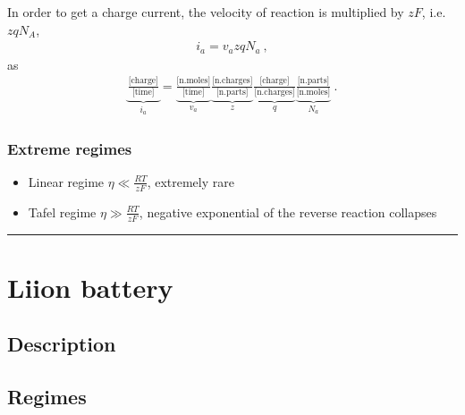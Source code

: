 \documentclass[letterpaper,10pt,english]{jupyterBook}
\begin{document}
\sphinxAtStartPar
In order to get a charge current, the velocity of reaction is multiplied by \(z F\), i.e. \(z q N_A\),
\begin{equation*}
\begin{split}i_a = v_a z q N_a \ ,\end{split}
\end{equation*}
\sphinxAtStartPar
as
\begin{equation*}
\begin{split}
\underbrace{\frac{\text{[charge]}}{\text{[time]}}}_{i_a} = 
\underbrace{\frac{\text{[n.moles]}}{\text{[time]}}}_{v_a}
\underbrace{\frac{\text{[n.charges]}}{\text{[n.parts]}}}_{z}
\underbrace{\frac{\text{[charge]}}{\text{[n.charges]}}}_{q}
\underbrace{\frac{\text{[n.parts]}}{\text{[n.moles]}}}_{N_a} \  .\end{split}
\end{equation*}\subsubsection*{Extreme regimes}
\begin{itemize}
\item {} 
\sphinxAtStartPar
Linear regime \(\eta \ll \frac{RT}{zF}\), extremely rare

\item {} 
\sphinxAtStartPar
Tafel regime \(\eta \gg \frac{RT}{zF}\), negative exponential of the reverse reaction collapses

\end{itemize}


\bigskip\hrule\bigskip


\sphinxstepscope


\section{Li\sphinxhyphen{}ion battery}
\label{\detokenize{ch/batteries-li:li-ion-battery}}\label{\detokenize{ch/batteries-li:electro-chemical-batteries-li}}\label{\detokenize{ch/batteries-li::doc}}

\subsection{Description}
\label{\detokenize{ch/batteries-li:description}}\label{\detokenize{ch/batteries-li:electro-chemical-batteries-li-description}}

\subsection{Regimes}
\label{\detokenize{ch/batteries-li:regimes}}\label{\detokenize{ch/batteries-li:electro-chemical-batteries-li-regimes}}
\end{document}

